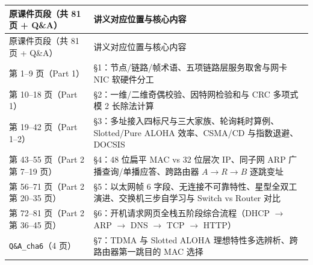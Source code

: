 \begingroup\small\setlength{\tabcolsep}{3pt}\renewcommand{\arraystretch}{1.22}
\begin{longtable}{@{}>{\raggedright\arraybackslash}p{}>{\raggedright\arraybackslash}p{}@{}}
\toprule
原课件页段（共 81 页 + Q\&A） & 讲义对应位置与核心内容 \\
\midrule\endfirsthead
原课件页段（共 81 页 + Q\&A） & 讲义对应位置与核心内容 \\
\midrule\endhead
\bottomrule\endfoot
第 1–9 页（Part 1） & §1：节点/链路/帧术语、五项链路层服务取舍与网卡 NIC 软硬件分工 \\
第 10–18 页（Part 1） & §2：一维/二维奇偶校验、因特网检验和与 CRC 多项式模 2 长除法计算 \\
第 19–42 页（Part 1–2） & §3：多址接入四标尺与三大家族、轮询耗时算例、Slotted/Pure ALOHA 效率、CSMA/CD 与指数退避、DOCSIS \\
第 43–55 页（Part 2 第 7–19 页） & §4：48 位扁平 MAC vs 32 位层次 IP、同子网 ARP 广播查询/单播应答、跨路由器 $A\to R\to B$ 逐跳变址 \\
第 56–71 页（Part 2 第 20–35 页） & §5：以太网帧 6 字段、无连接不可靠特性、星型全双工演进、交换机三步自学习与 Switch vs Router 对比 \\
第 72–81 页（Part 2 第 36–45 页） & §6：开机请求网页全栈五阶段综合流程（DHCP $\to$ ARP $\to$ DNS $\to$ TCP $\to$ HTTP） \\
\texttt{Q\&A\_cha6}（4 页） & §7：TDMA 与 Slotted ALOHA 理想特性多选辨析、跨路由器第一跳目的 MAC 选择 \\
\end{longtable}\endgroup
